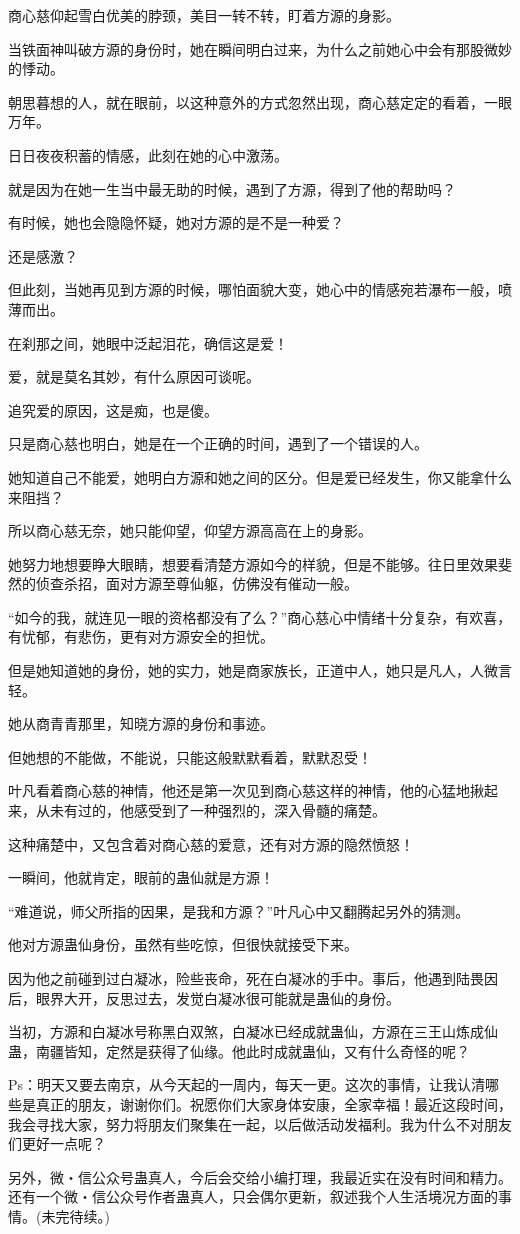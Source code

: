 \begin{this_body}
商心慈仰起雪白优美的脖颈，美目一转不转，盯着方源的身影。

当铁面神叫破方源的身份时，她在瞬间明白过来，为什么之前她心中会有那股微妙的悸动。

朝思暮想的人，就在眼前，以这种意外的方式忽然出现，商心慈定定的看着，一眼万年。

日日夜夜积蓄的情感，此刻在她的心中激荡。

就是因为在她一生当中最无助的时候，遇到了方源，得到了他的帮助吗？

有时候，她也会隐隐怀疑，她对方源的是不是一种爱？

还是感激？

但此刻，当她再见到方源的时候，哪怕面貌大变，她心中的情感宛若瀑布一般，喷薄而出。

在刹那之间，她眼中泛起泪花，确信这是爱！

爱，就是莫名其妙，有什么原因可谈呢。

追究爱的原因，这是痴，也是傻。

只是商心慈也明白，她是在一个正确的时间，遇到了一个错误的人。

她知道自己不能爱，她明白方源和她之间的区分。但是爱已经发生，你又能拿什么来阻挡？

所以商心慈无奈，她只能仰望，仰望方源高高在上的身影。

她努力地想要睁大眼睛，想要看清楚方源如今的样貌，但是不能够。往日里效果斐然的侦查杀招，面对方源至尊仙躯，仿佛没有催动一般。

“如今的我，就连见一眼的资格都没有了么？”商心慈心中情绪十分复杂，有欢喜，有忧郁，有悲伤，更有对方源安全的担忧。

但是她知道她的身份，她的实力，她是商家族长，正道中人，她只是凡人，人微言轻。

她从商青青那里，知晓方源的身份和事迹。

但她想的不能做，不能说，只能这般默默看着，默默忍受！

叶凡看着商心慈的神情，他还是第一次见到商心慈这样的神情，他的心猛地揪起来，从未有过的，他感受到了一种强烈的，深入骨髓的痛楚。

这种痛楚中，又包含着对商心慈的爱意，还有对方源的隐然愤怒！

一瞬间，他就肯定，眼前的蛊仙就是方源！

“难道说，师父所指的因果，是我和方源？”叶凡心中又翻腾起另外的猜测。

他对方源蛊仙身份，虽然有些吃惊，但很快就接受下来。

因为他之前碰到过白凝冰，险些丧命，死在白凝冰的手中。事后，他遇到陆畏因后，眼界大开，反思过去，发觉白凝冰很可能就是蛊仙的身份。

当初，方源和白凝冰号称黑白双煞，白凝冰已经成就蛊仙，方源在三王山炼成仙蛊，南疆皆知，定然是获得了仙缘。他此时成就蛊仙，又有什么奇怪的呢？

Ps：明天又要去南京，从今天起的一周内，每天一更。这次的事情，让我认清哪些是真正的朋友，谢谢你们。祝愿你们大家身体安康，全家幸福！最近这段时间，我会寻找大家，努力将朋友们聚集在一起，以后做活动发福利。我为什么不对朋友们更好一点呢？

另外，微・信公众号蛊真人，今后会交给小编打理，我最近实在没有时间和精力。还有一个微・信公众号作者蛊真人，只会偶尔更新，叙述我个人生活境况方面的事情。(未完待续。)

\end{this_body}

